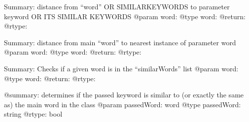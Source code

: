 \documentclass[letterpaper,10pt,english]{sphinxmanual}
\begin{document}
\begin{fulllineitems}
\begin{fulllineitems}
\end{fulllineitems}


\begin{fulllineitems}
\label{\detokenize{Keyword:Keyword.Keyword.distancefromkeywordtonearestkeyword}}
Summary: distance from “word” OR SIMILARKEYWORDS to parameter keyword OR ITS SIMILAR KEYWORDS
@param word:
@type word:
@return:
@rtype:

\end{fulllineitems}


\begin{fulllineitems}
\label{\detokenize{Keyword:Keyword.Keyword.distancetonearest}}
Summary: distance from main “word” to nearest instance of parameter word
@param word:
@type word:
@return:
@rtype:

\end{fulllineitems}


\begin{fulllineitems}
\label{\detokenize{Keyword:Keyword.Keyword.isinsimilarlist}}
Summary: Checks if a given word is in the “similarWords” list
@param word:
@type word:
@return:
@rtype:

\end{fulllineitems}


\begin{fulllineitems}
\label{\detokenize{Keyword:Keyword.Keyword.issimilar}}
@summary: determines if the passed keyword is similar to (or exactly the same as) the main word in the class
@param passedWord: word
@type passedWord: string
@rtype: bool

\end{fulllineitems}



\end{fulllineitems}
\end{document}
